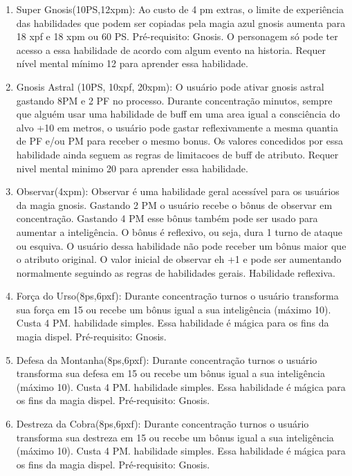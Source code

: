 \begin{enumerate}
	\item Super Gnosis(10PS,12xpm): Ao custo de 4 pm extras, o limite de experiência das habilidades que podem ser copiadas pela magia azul gnosis aumenta para 18 xpf e 18 xpm ou 60 PS. Pré-requisito: Gnosis. O personagem só pode ter acesso a essa habilidade de acordo com algum evento na historia. Requer nível mental mínimo 12 para aprender essa habilidade.
	
	\item Gnosis Astral (10PS, 10xpf, 20xpm): O usuário pode ativar gnosis astral gastando 8PM e 2 PF no processo. Durante concentração minutos, sempre que alguém usar uma habilidade de buff em uma area igual a consciência do alvo +10 em metros, o usuário pode gastar reflexivamente a mesma quantia de PF e/ou PM para receber o mesmo bonus. Os valores concedidos por essa habilidade ainda seguem as regras de limitacoes de buff de atributo. Requer nivel mental minimo 20 para aprender essa habilidade.
	
	\item Observar(4xpm): Observar é uma habilidade geral acessível para os usuários da magia gnosis. Gastando 2 PM o usuário recebe o bônus de observar em concentração. Gastando 4 PM esse bônus também pode ser usado para aumentar a inteligência. O bônus é reflexivo, ou seja, dura 1 turno de ataque ou esquiva. O usuário dessa habilidade não pode receber um bônus maior que o atributo original. O valor inicial de observar eh +1 e pode ser aumentando normalmente seguindo as regras de habilidades gerais. Habilidade reflexiva.	
 
	\item Força do Urso(8ps,6pxf): Durante concentração turnos o usuário transforma sua força em 15 ou recebe um bônus igual a sua inteligência (máximo 10). Custa 4 PM. habilidade simples. Essa habilidade é mágica para os fins da magia dispel. Pré-requisito: Gnosis.

	\item Defesa da Montanha(8ps,6pxf): Durante concentração turnos o usuário transforma sua defesa em 15 ou recebe um bônus igual a sua inteligência (máximo 10). Custa 4 PM. habilidade simples. Essa habilidade é mágica para os fins da magia dispel. Pré-requisito: Gnosis.

	\item Destreza da Cobra(8ps,6pxf): Durante concentração turnos o usuário transforma sua destreza em 15 ou recebe um bônus igual a sua inteligência (máximo 10). Custa 4 PM. habilidade simples. Essa habilidade é mágica para os fins da magia dispel. Pré-requisito: Gnosis.


\end{enumerate}
